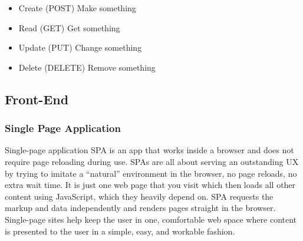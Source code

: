 \begin{itemize}
      \item 
      Create (POST) Make something
      \item 
      Read (GET) Get something
      \item 
      Update (PUT) Change something
      \item 
      Delete (DELETE) Remove something
\end{itemize}




\subsection{Front-End}
\subsubsection{Single Page Application}
Single-page application \ac{SPA} is an app that works inside a browser and does not require page reloading during use.
SPAs are all about serving an outstanding UX by trying to imitate a “natural” environment in the browser, no page reloads, no extra wait time. It is just one web page that you visit which then loads all other content using JavaScript, which they heavily depend on.
SPA requests the markup and data independently and renders pages straight in the browser.
Single-page sites help keep the user in one, comfortable web space where content is presented to the user in a simple, easy, and workable fashion.
